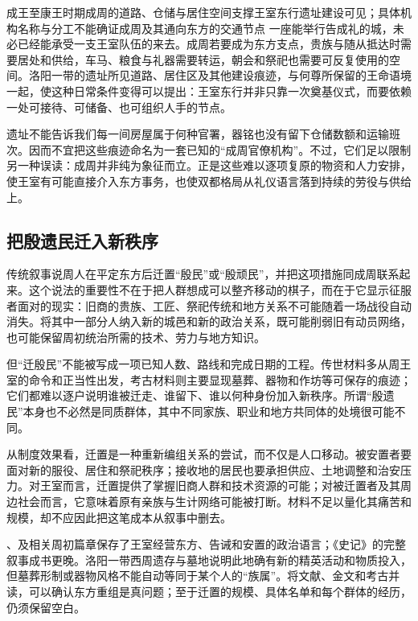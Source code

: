\begin{event}{成王至康王时期}{成周的道路、仓储与居住空间支撑王室东行}{遗址建设可见；具体机构名称与分工不能确证}{成周及其通向东方的交通节点}
一座能举行告成礼的城，未必已经能承受一支王室队伍的来去。成周若要成为东方支点，贵族与随从抵达时需要居处和供给，车马、粮食与礼器需要转运，朝会和祭祀也需要可反复使用的空间。洛阳一带的遗址所见道路、居住区及其他建设痕迹，与何尊所保留的王命语境一起，使这种日常条件变得可以提出：王室东行并非只靠一次奠基仪式，而要依赖一处可接待、可储备、也可组织人手的节点。

遗址不能告诉我们每一间房屋属于何种官署，器铭也没有留下仓储数额和运输班次。因而不宜把这些痕迹命名为一套已知的“成周官僚机构”。不过，它们足以限制另一种误读：成周并非纯为象征而立。正是这些难以逐项复原的物资和人力安排，使王室有可能直接介入东方事务，也使双都格局从礼仪语言落到持续的劳役与供给上。
\end{event}

\subsection{把殷遗民迁入新秩序}

传统叙事说周人在平定东方后迁置“殷民”或“殷顽民”，并把这项措施同成周联系起来。这个说法的重要性不在于把人群想成可以整齐移动的棋子，而在于它显示征服者面对的现实：旧商的贵族、工匠、祭祀传统和地方关系不可能随着一场战役自动消失。将其中一部分人纳入新的城邑和新的政治关系，既可能削弱旧有动员网络，也可能保留周初统治所需的技术、劳力与地方知识。

但“迁殷民”不能被写成一项已知人数、路线和完成日期的工程。传世材料多从周王室的命令和正当性出发，考古材料则主要显现墓葬、器物和作坊等可保存的痕迹；它们都难以逐户说明谁被迁走、谁留下、谁以何种身份加入新秩序。所谓“殷遗民”本身也不必然是同质群体，其中不同家族、职业和地方共同体的处境很可能不同。

从制度效果看，迁置是一种重新编组关系的尝试，而不仅是人口移动。被安置者要面对新的服役、居住和祭祀秩序；接收地的居民也要承担供应、土地调整和治安压力。对王室而言，迁置提供了掌握旧商人群和技术资源的可能；对被迁置者及其周边社会而言，它意味着原有亲族与生计网络可能被打断。材料不足以量化其痛苦和规模，却不应因此把这笔成本从叙事中删去。

\begin{sourcenote}
、及相关周初篇章保存了王室经营东方、告诫和安置的政治语言；《史记》的完整叙事成书更晚。洛阳一带西周遗存与墓地说明此地确有新的精英活动和物质投入，但墓葬形制或器物风格不能自动等同于某个人的“族属”。将文献、金文和考古并读，可以确认东方重组是真问题；至于迁置的规模、具体名单和每个群体的经历，仍须保留空白。
\end{sourcenote}

